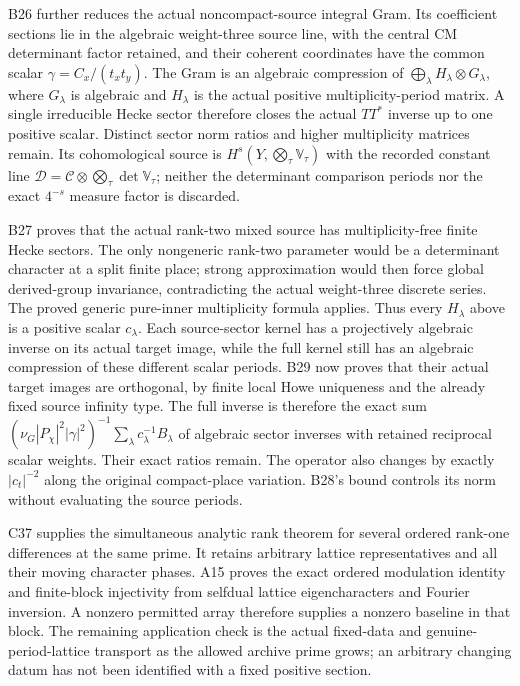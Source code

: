 B26 further reduces the actual noncompact-source integral Gram.
Its coefficient sections lie in the algebraic weight-three
source line, with the central CM determinant factor retained,
and their coherent coordinates have the common scalar
$\gamma=C_x/(t_x t_y)$. The Gram is an algebraic compression
of $\bigoplus_\lambda H_\lambda\otimes G_\lambda$, where
$G_\lambda$ is algebraic and $H_\lambda$ is the actual positive
multiplicity-period matrix. A single irreducible Hecke sector
therefore closes the actual $TT^*$ inverse up to one positive
scalar. Distinct sector norm ratios and higher multiplicity
matrices remain. Its cohomological source is
$H^s(Y,\bigotimes_\tau\mathbb V_\tau)$ with the recorded
constant line $\mathscr D=\mathscr C\otimes\bigotimes_\tau
\det\mathbb V_\tau$; neither the determinant comparison periods
nor the exact $4^{-s}$ measure factor is discarded.

B27 proves that the actual rank-two mixed source has
multiplicity-free finite Hecke sectors. The only nongeneric
rank-two parameter would be a determinant character at a
split finite place; strong approximation would then force
global derived-group invariance, contradicting the actual
weight-three discrete series. The proved generic pure-inner
multiplicity formula applies. Thus every $H_\lambda$ above
is a positive scalar $c_\lambda$. Each source-sector kernel
has a projectively algebraic inverse on its actual target
image, while the full kernel still has an algebraic
compression of these different scalar periods. B29 now proves
that their actual target images are orthogonal, by finite local
Howe uniqueness and the already fixed source infinity type.
The full inverse is therefore the exact sum
$(\nu_G|P_\chi|^2|\gamma|^2)^{-1}
\sum_\lambda c_\lambda^{-1}B_\lambda$ of algebraic sector
inverses with retained reciprocal scalar weights. Their exact
ratios remain. The operator also changes by exactly
$|c_t|^{-2}$ along the original compact-place variation.
B28's bound controls its norm without evaluating the source
periods.

C37 supplies the simultaneous analytic rank theorem for several
ordered rank-one differences at the same prime. It retains arbitrary
lattice representatives and all their moving character phases. A15 proves the exact ordered modulation identity and finite-block
injectivity from selfdual lattice eigencharacters and Fourier
inversion. A nonzero permitted array therefore supplies a nonzero
baseline in that block. The remaining application check is the
actual fixed-data and genuine-period-lattice transport as the
allowed archive prime grows; an arbitrary changing datum has
not been identified with a fixed positive section.

